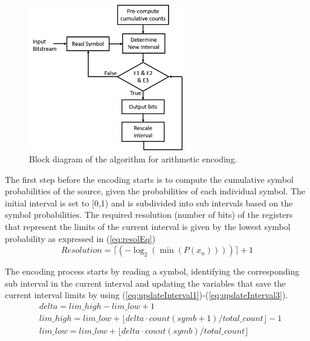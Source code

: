 \begin{refsection}
\begin{figure}[t]
	\centering
	\includegraphics[width=0.6\textwidth]{./sdf/eit_46084_arithmetic_encoder_decoder/figures/ArithEncoderBlockDiagram.png}
	\caption{Block diagram of the algorithm for arithmetic encoding.} \label{fig:arithEncBlockDiagr}
\end{figure}

The first step before the encoding starts is to compute the cumulative symbol probabilities of the source, given the probabilities of each individual symbol. The initial interval is set to [0,1) and is subdivided into sub intervals based on the symbol probabilities. The required resolution (number of bits) of the registers that represent the limits of the current interval is given by the lowest symbol probability as expressed in (\ref{eq:resolEq})
\begin{equation} \label{eq:resolEq}
	Resolution = \lceil(-\log_2(\min(P(x_n))))\rceil + 1
\end{equation}

The encoding process starts by reading a symbol, identifying the corresponding sub interval in the current interval and updating the variables that save the current interval limits by using (\ref{eq:updateInterval1})-(\ref{eq:updateInterval3}).
\begin{eqnarray}
\label{eq:updateInterval1} &delta = lim\_high - lim\_low + 1 \\
&lim\_high = lim\_low + \lfloor delta \cdot count(symb + 1) / total\_count \rfloor - 1 \\
\label{eq:updateInterval3} &lim\_low = lim\_low + \lfloor delta \cdot count(symb) / total\_count \rfloor
\end{eqnarray}


\end{refsection}
